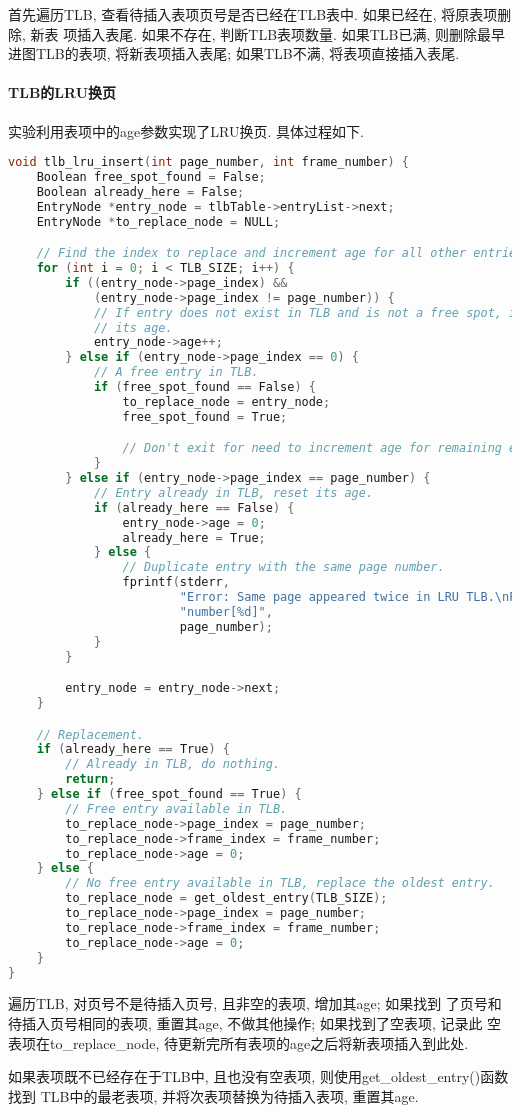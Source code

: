 首先遍历TLB, 查看待插入表项页号是否已经在TLB表中. 如果已经在, 将原表项删除, 新表
项插入表尾. 如果不存在, 判断TLB表项数量. 如果TLB已满, 则删除最早进图TLB的表项,
将新表项插入表尾; 如果TLB不满, 将表项直接插入表尾.

\paragraph{TLB的LRU换页}
实验利用表项中的age参数实现了LRU换页. 具体过程如下.
\begin{lstlisting}[language=c++]
void tlb_lru_insert(int page_number, int frame_number) {
    Boolean free_spot_found = False;
    Boolean already_here = False;
    EntryNode *entry_node = tlbTable->entryList->next;
    EntryNode *to_replace_node = NULL;

    // Find the index to replace and increment age for all other entries.
    for (int i = 0; i < TLB_SIZE; i++) {
        if ((entry_node->page_index) &&
            (entry_node->page_index != page_number)) {
            // If entry does not exist in TLB and is not a free spot, increment
            // its age.
            entry_node->age++;
        } else if (entry_node->page_index == 0) {
            // A free entry in TLB.
            if (free_spot_found == False) {
                to_replace_node = entry_node;
                free_spot_found = True;

                // Don't exit for need to increment age for remaining entries.
            }
        } else if (entry_node->page_index == page_number) {
            // Entry already in TLB, reset its age.
            if (already_here == False) {
                entry_node->age = 0;
                already_here = True;
            } else {
                // Duplicate entry with the same page number.
                fprintf(stderr,
                        "Error: Same page appeared twice in LRU TLB.\nPage "
                        "number[%d]",
                        page_number);
            }
        }

        entry_node = entry_node->next;
    }

    // Replacement.
    if (already_here == True) {
        // Already in TLB, do nothing.
        return;
    } else if (free_spot_found == True) {
        // Free entry available in TLB.
        to_replace_node->page_index = page_number;
        to_replace_node->frame_index = frame_number;
        to_replace_node->age = 0;
    } else {
        // No free entry available in TLB, replace the oldest entry.
        to_replace_node = get_oldest_entry(TLB_SIZE);
        to_replace_node->page_index = page_number;
        to_replace_node->frame_index = frame_number;
        to_replace_node->age = 0;
    }
}
\end{lstlisting}

遍历TLB, 对页号不是待插入页号, 且非空的表项, 增加其age; 如果找到
了页号和待插入页号相同的表项, 重置其age, 不做其他操作; 如果找到了空表项, 记录此
空表项在to\_replace\_node, 待更新完所有表项的age之后将新表项插入到此处.\par

如果表项既不已经存在于TLB中, 且也没有空表项, 则使用get\_oldest\_entry()函数找到
TLB中的最老表项, 并将次表项替换为待插入表项, 重置其age.